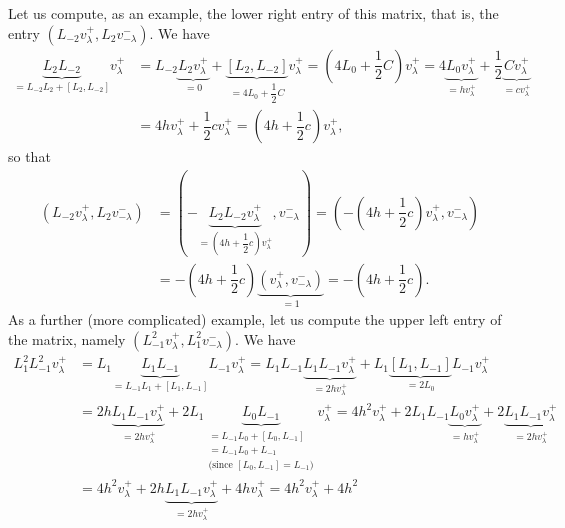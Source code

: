 \documentclass[etingof-lie.tex]{subfiles}
\begin{document}
\begin{example}
Let us compute, as an example, the lower right entry of this matrix, that is,
the entry $\left(  L_{-2}v_{\lambda}^{+},L_{2}v_{-\lambda}^{-}\right)  $. We
have%
\begin{align*}
\underbrace{L_{2}L_{-2}}_{=L_{-2}L_{2}+\left[  L_{2},L_{-2}\right]
}v_{\lambda}^{+}  &  =L_{-2}\underbrace{L_{2}v_{\lambda}^{+}}_{=0}%
+\underbrace{\left[  L_{2},L_{-2}\right]  }_{=4L_{0}+\dfrac{1}{2}C}v_{\lambda
}^{+}=\left(  4L_{0}+\dfrac{1}{2}C\right)  v_{\lambda}^{+}=4\underbrace{L_{0}%
v_{\lambda}^{+}}_{=hv_{\lambda}^{+}}+\dfrac{1}{2}\underbrace{Cv_{\lambda}^{+}%
}_{=cv_{\lambda}^{+}}\\
&  =4hv_{\lambda}^{+}+\dfrac{1}{2}cv_{\lambda}^{+}=\left(  4h+\dfrac{1}%
{2}c\right)  v_{\lambda}^{+},
\end{align*}
so that%
\begin{align*}
\left(  L_{-2}v_{\lambda}^{+},L_{2}v_{-\lambda}^{-}\right)   &  =\left(
-\underbrace{L_{2}L_{-2}v_{\lambda}^{+}}_{=\left(  4h+\dfrac{1}{2}c\right)
v_{\lambda}^{+}},v_{-\lambda}^{-}\right)  =\left(  -\left(  4h+\dfrac{1}%
{2}c\right)  v_{\lambda}^{+},v_{-\lambda}^{-}\right) \\
&  =-\left(  4h+\dfrac{1}{2}c\right)  \underbrace{\left(  v_{\lambda}%
^{+},v_{-\lambda}^{-}\right)  }_{=1}=-\left(  4h+\dfrac{1}{2}c\right)  .
\end{align*}
As a further (more complicated) example, let us compute the upper left entry
of the matrix, namely $\left(  L_{-1}^{2}v_{\lambda}^{+},L_{1}^{2}v_{-\lambda
}^{-}\right)  $. We have%
\begin{align*}
L_{1}^{2}L_{-1}^{2}v_{\lambda}^{+}  &  =L_{1}\underbrace{L_{1}L_{-1}}%
_{=L_{-1}L_{1}+\left[  L_{1},L_{-1}\right]  }L_{-1}v_{\lambda}^{+}=L_{1}%
L_{-1}\underbrace{L_{1}L_{-1}v_{\lambda}^{+}}_{=2hv_{\lambda}^{+}}%
+L_{1}\underbrace{\left[  L_{1},L_{-1}\right]  }_{=2L_{0}}L_{-1}v_{\lambda
}^{+}\\
&  =2h\underbrace{L_{1}L_{-1}v_{\lambda}^{+}}_{=2hv_{\lambda}^{+}}%
+2L_{1}\underbrace{L_{0}L_{-1}}_{\substack{=L_{-1}L_{0}+\left[  L_{0}%
,L_{-1}\right]  \\=L_{-1}L_{0}+L_{-1}\\\text{(since }\left[  L_{0}%
,L_{-1}\right]  =L_{-1}\text{)}}}v_{\lambda}^{+}=4h^{2}v_{\lambda}^{+}%
+2L_{1}L_{-1}\underbrace{L_{0}v_{\lambda}^{+}}_{=hv_{\lambda}^{+}%
}+2\underbrace{L_{1}L_{-1}v_{\lambda}^{+}}_{=2hv_{\lambda}^{+}}\\
&  =4h^{2}v_{\lambda}^{+}+2h\underbrace{L_{1}L_{-1}v_{\lambda}^{+}%
}_{=2hv_{\lambda}^{+}}+4hv_{\lambda}^{+}=4h^{2}v_{\lambda}^{+}+4h^{2}%

\end{align*}
\end{example}
\end{document}
